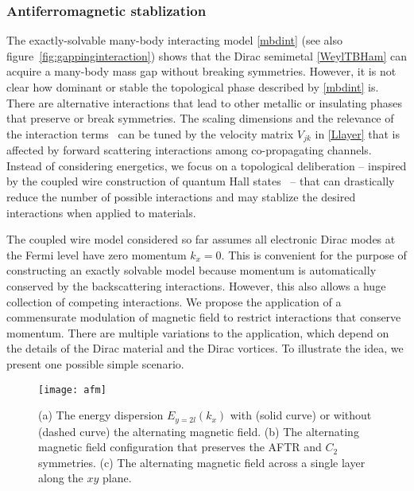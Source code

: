 \subsubsection{Antiferromagnetic stablization}\label{sec:AFMstablization}
The exactly-solvable many-body interacting model \eqref{mbdint} (see also figure~\ref{fig:gappinginteraction}) shows that the Dirac semimetal \eqref{WeylTBHam} can acquire a many-body mass gap without breaking symmetries. However, it is not clear how dominant or stable the topological phase described by \eqref{mbdint} is. There are alternative interactions that lead to other metallic or insulating phases that preserve or break symmetries. The scaling dimensions and the relevance of the interaction terms~\cite{Fradkinbook,Tsvelikbook} can be tuned by the velocity matrix $V_{jk}$ in \eqref{Llayer} that is affected by forward scattering interactions among co-propagating channels. Instead of considering energetics, we focus on a topological deliberation -- inspired by the coupled wire construction of quantum Hall states~\cite{KaneMukhopadhyayLubensky02,TeoKaneCouplewires} -- that can drastically reduce the number of possible interactions and may stablize the desired interactions when applied to materials.

The coupled wire model considered so far assumes all electronic Dirac modes at the Fermi level have zero momentum $k_x=0$. This is convenient for the purpose of constructing an exactly solvable model because momentum is automatically conserved by the backscattering interactions. However, this also allows a huge collection of competing interactions. We propose the application of a commensurate modulation of magnetic field to restrict interactions that conserve momentum. There are multiple variations to the application, which depend on the details of the Dirac material and the Dirac vortices. To illustrate the idea, we present one possible simple scenario.

\begin{figure}[htbp]
\centering\texttt{[image: afm]}
\caption{(a) The energy dispersion $E_{y=2l}(k_x)$ with (solid curve) or without (dashed curve) the alternating magnetic field. (b) The alternating magnetic field configuration that preserves the AFTR and $C_2$ symmetries. (c) The alternating magnetic field across a single layer along the $xy$ plane.}\label{fig:afm}
\end{figure}

